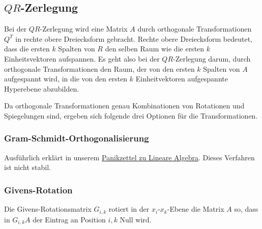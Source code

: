 \documentclass[a4paper,parskip=half*,DIV=15,fontsize=11pt]{scrartcl}
\begin{document}
\subsection[QR-Zerlegung]{$QR$-Zerlegung}

Bei der $QR$-Zerlegung wird eine Matrix $A$ durch orthogonale Transformationen $Q^T$ in rechte obere Dreiecksform gebracht. Rechte obere Dreiecksform bedeutet, dass die ersten $k$ Spalten von $R$ den selben Raum wie die ersten $k$ Einheitsvektoren aufspannen. Es geht also bei der $QR$-Zerlegung darum, durch orthogonale Transformationen den Raum, der von den ersten $k$ Spalten von $A$ aufgespannt wird, in die von den ersten $k$ Einheitvektoren aufgespannte Hyperebene abzubilden.

Da orthogonale Transformationen genau Kombinationen von Rotationen und Spiegelungen sind, ergeben sich folgende drei Optionen für die Transformationen.

\subsubsection{Gram-Schmidt-Orthogonalisierung}

Ausführlich erklärt in unserem \href{http://panikzettel.philworld.de/la.pdf#page=20}{Panikzettel zu Lineare Algebra}. Dieses Verfahren ist nicht stabil.

\subsubsection{Givens-Rotation}

Die Givens-Rotationsmatrix $G_{i,k}$ rotiert in der $x_i$-$x_k$-Ebene die Matrix $A$ so, dass in $G_{i,k} A$ der Eintrag an Position $i, k$ Null wird.
\end{document}
